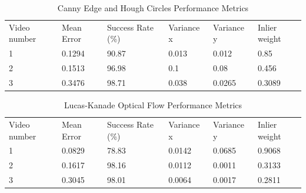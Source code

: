 \documentclass[12pt,a4paper]{article}
\begin{document}
\begin{table}[H]
\centering
\caption{Canny Edge and Hough Circles Performance Metrics}
\begin{tabular}{p{2cm} p{2cm} p{1.7cm} p{1.75cm} p{1.75cm} p{1.75cm}}
\toprule
Video number & Mean Error & Success Rate (\%) & Variance x & Variance y & Inlier weight \\
1 & 0.1294 & 90.87 & 0.013 & 0.012 & 0.85 \\
2 & 0.1513 & 96.98 & 0.1 & 0.08 & 0.456 \\
3 & 0.3476 & 98.71 & 0.038 & 0.0265 & 0.3089 \\
\bottomrule
\end{tabular}
\end{table}

\begin{table}[H]
\centering
\caption{Lucas-Kanade Optical Flow Performance Metrics}
\begin{tabular}{p{2cm} p{2cm} p{1.7cm} p{1.75cm} p{1.75cm} p{1.75cm}}
\toprule
Video number & Mean Error & Success Rate (\%) & Variance x & Variance y & Inlier weight \\
1 & 0.0829 & 78.83 & 0.0142 & 0.0685 & 0.9068 \\
2 & 0.1617 & 98.16 & 0.0112 & 0.0011 & 0.3133 \\
3 & 0.3045 & 98.01 & 0.0064 & 0.0017 & 0.2811 \\
\bottomrule
\end{tabular}
\end{table}
\end{document}
